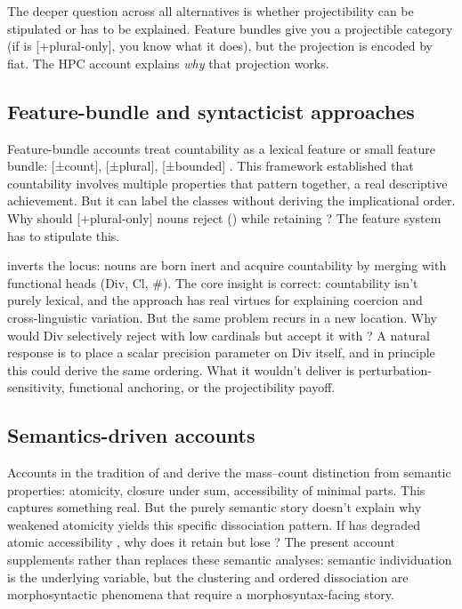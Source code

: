 \documentclass[12pt,a4paper]{article}
\begin{document}
The deeper question across all alternatives is whether projectibility can be stipulated or has to be explained. Feature bundles give you a projectible category (if  is [+plural-only], you know what it does), but the projection is encoded by fiat. The HPC account explains \textit{why} that projection works.

\subsection{Feature-bundle and syntacticist approaches}

Feature-bundle accounts treat countability as a lexical feature or small feature bundle: [±count], [±plural], [±bounded] \citep{chomsky1965,allan1980}. This framework established that countability involves multiple properties that pattern together, a real descriptive achievement. But it can label the classes without deriving the implicational order. Why should [+plural-only] nouns reject () while retaining ? The feature system has to stipulate this.

\textcite{borer2005} inverts the locus: nouns are born inert and acquire countability by merging with functional heads (Div, Cl, \#). The core insight is correct: countability isn't purely lexical, and the approach has real virtues for explaining coercion and cross-linguistic variation. But the same problem recurs in a new location. Why would Div selectively reject  with low cardinals but accept it with ? A natural response is to place a scalar precision parameter on Div itself, and in principle this could derive the same ordering. What it wouldn't deliver is perturbation-sensitivity, functional anchoring, or the projectibility payoff.

\subsection{Semantics-driven accounts}

Accounts in the tradition of \textcite{chierchia1998} and \textcite{rothstein2010} derive the mass--count distinction from semantic properties: atomicity, closure under sum, accessibility of minimal parts. This captures something real. But the purely semantic story doesn't explain why weakened atomicity yields this specific dissociation pattern. If  has degraded atomic accessibility \citep{grimm2018}, why does it retain  but lose ? The present account supplements rather than replaces these semantic analyses: semantic individuation is the underlying variable, but the clustering and ordered dissociation are morphosyntactic phenomena that require a morphosyntax-facing story.
\end{document}
